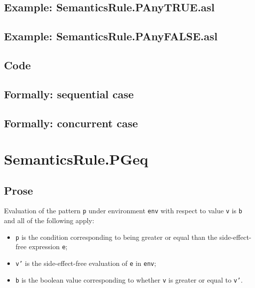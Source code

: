 \documentclass{book}
\begin{document}
    \subsection{Example: SemanticsRule.PAnyTRUE.asl}

    \subsection{Example: SemanticsRule.PAnyFALSE.asl}

    \subsection{Code}

\begin{emptyformal}
    \subsection{Formally: sequential case}

    \subsection{Formally: concurrent case}
\end{emptyformal}


\section{SemanticsRule.PGeq \label{sec:SemanticsRule.PGeq}}

    \subsection{Prose}
    Evaluation of the pattern \texttt{p} under environment \texttt{env} with
    respect to value \texttt{v} is \texttt{b} and all of the following apply:
    \begin{itemize}
      \item \texttt{p} is the condition corresponding to being greater or equal
        than the side-effect-free expression \texttt{e};
      \item \texttt{v'} is the side-effect-free evaluation of \texttt{e} in
        \texttt{env};
      \item \texttt{b} is the boolean value corresponding to whether \texttt{v}
        is greater or equal to \texttt{v'}.
    \end{itemize}
\end{document}
